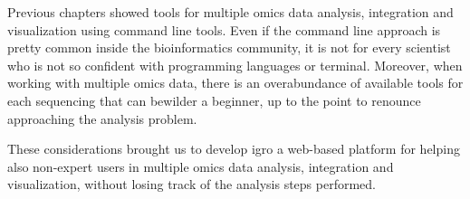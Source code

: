 Previous chapters showed tools for multiple omics data analysis, integration and visualization using command line tools.
Even if the command line approach is pretty common inside the bioinformatics community, it is not for every scientist who is not so confident with programming languages or terminal.
Moreover, when working with multiple omics data, there is an overabundance of available tools for each sequencing that can bewilder a beginner, up to the point to renounce approaching the analysis problem.

These considerations brought us to develop \gls{igro} a web-based platform for helping also non-expert users in multiple omics data analysis, integration and visualization, without losing track of the analysis steps performed.

